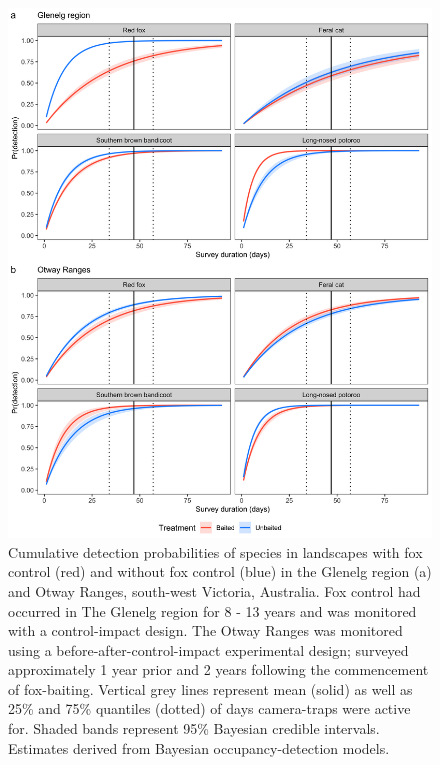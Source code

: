 \documentclass[11pt,a4paper,titlepage,twoside,openright]{style/unimelbthesis}
\begin{document}
\begin{mainmatter}
\begin{figure}
{\centering \includegraphics[width=1\linewidth]{figure/cumulative_detectability} 

}

\caption{Cumulative detection probabilities of species in landscapes with fox control (red) and without fox control (blue) in the Glenelg region (a) and Otway Ranges, south-west Victoria, Australia. Fox control had occurred in The Glenelg region for 8 - 13 years and was monitored with a control-impact design. The Otway Ranges was monitored using a before-after-control-impact experimental design; surveyed approximately 1 year prior and 2 years following the commencement of fox-baiting. Vertical grey lines represent mean (solid) as well as 25\% and 75\% quantiles (dotted) of days camera-traps were active for. Shaded bands represent 95\% Bayesian credible intervals. Estimates derived from Bayesian occupancy-detection models.}\label{fig:occ-cumdet}
\end{figure}
\newpage


\end{mainmatter}
\end{document}
